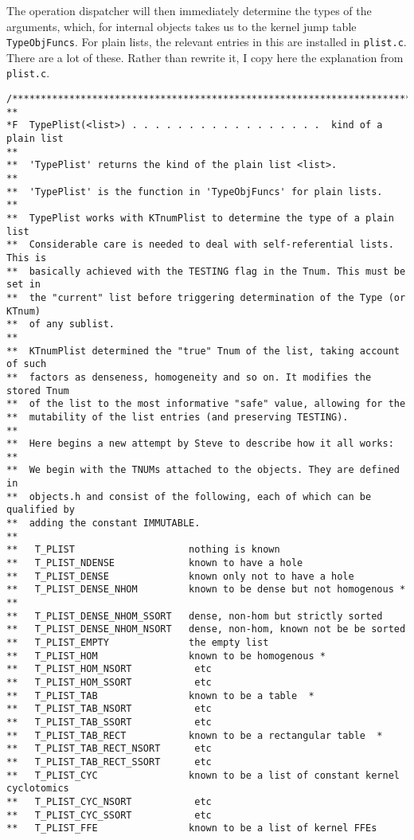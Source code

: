 \documentclass{article}
\begin{document}
The operation dispatcher will then immediately determine the types of
the arguments, which, for internal objects takes us to the kernel
jump table \verb|TypeObjFuncs|. For plain lists, the relevant entries
in this are installed in \verb|plist.c|. There are a lot of
these. Rather than rewrite it, I copy here the  explanation from
\verb|plist.c|.
\begin{verbatim}
/****************************************************************************
**
*F  TypePlist(<list>) . . . . . . . . . . . . . . . . .  kind of a plain list
**
**  'TypePlist' returns the kind of the plain list <list>.
**
**  'TypePlist' is the function in 'TypeObjFuncs' for plain lists.
**
**  TypePlist works with KTnumPlist to determine the type of a plain list
**  Considerable care is needed to deal with self-referential lists. This is
**  basically achieved with the TESTING flag in the Tnum. This must be set in
**  the "current" list before triggering determination of the Type (or KTnum)
**  of any sublist.
**
**  KTnumPlist determined the "true" Tnum of the list, taking account of such
**  factors as denseness, homogeneity and so on. It modifies the stored Tnum
**  of the list to the most informative "safe" value, allowing for the
**  mutability of the list entries (and preserving TESTING).
**
**  Here begins a new attempt by Steve to describe how it all works:
**
**  We begin with the TNUMs attached to the objects. They are defined in
**  objects.h and consist of the following, each of which can be qualified by
**  adding the constant IMMUTABLE.
**
**   T_PLIST                    nothing is known
**   T_PLIST_NDENSE             known to have a hole
**   T_PLIST_DENSE              known only not to have a hole
**   T_PLIST_DENSE_NHOM         known to be dense but not homogenous *  **
**   T_PLIST_DENSE_NHOM_SSORT   dense, non-hom but strictly sorted
**   T_PLIST_DENSE_NHOM_NSORT   dense, non-hom, known not be be sorted
**   T_PLIST_EMPTY              the empty list
**   T_PLIST_HOM                known to be homogenous *
**   T_PLIST_HOM_NSORT           etc
**   T_PLIST_HOM_SSORT           etc
**   T_PLIST_TAB                known to be a table  *
**   T_PLIST_TAB_NSORT           etc
**   T_PLIST_TAB_SSORT           etc
**   T_PLIST_TAB_RECT           known to be a rectangular table  *
**   T_PLIST_TAB_RECT_NSORT      etc
**   T_PLIST_TAB_RECT_SSORT      etc
**   T_PLIST_CYC                known to be a list of constant kernel cyclotomics
**   T_PLIST_CYC_NSORT           etc
**   T_PLIST_CYC_SSORT           etc
**   T_PLIST_FFE                known to be a list of kernel FFEs

\end{verbatim}
\end{document}
